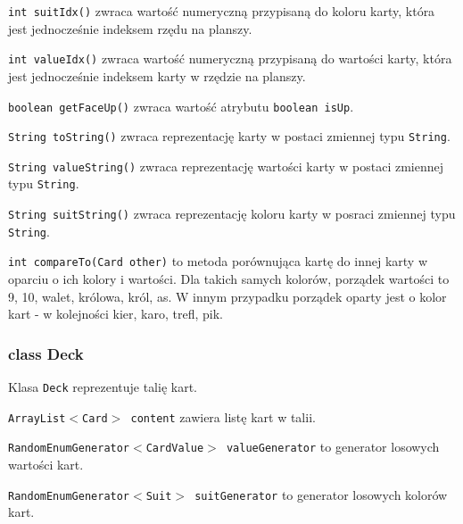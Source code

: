 \documentclass{article}
\begin{document}
\texttt{int suitIdx()} zwraca wartość numeryczną przypisaną do koloru karty, która jest jednocześnie indeksem rzędu na planszy.

\texttt{int valueIdx()} zwraca wartość numeryczną przypisaną do wartości karty, która jest jednocześnie indeksem karty w rzędzie na planszy.

\texttt{boolean getFaceUp()} zwraca wartość atrybutu \texttt{boolean isUp}.

\texttt{String toString()} zwraca reprezentację karty w postaci zmiennej typu \texttt{String}.

\texttt{String valueString()} zwraca reprezentację wartości karty w postaci zmiennej typu \texttt{String}.

\texttt{String suitString()} zwraca reprezentację koloru karty w posraci zmiennej typu \texttt{String}.

\texttt{int compareTo(Card other)} to metoda porównująca  kartę do innej karty w oparciu o ich kolory i wartości. Dla takich samych kolorów, porządek wartości to 9, 10, walet, królowa, król, as. W innym przypadku porządek oparty jest o kolor kart - w kolejności kier, karo, trefl, pik.

\subsubsection*{class Deck}

\begin{center}
\end{center}

Klasa \texttt{Deck} reprezentuje talię kart.

\texttt{ArrayList$<$Card$>$ content} zawiera listę kart w talii. 

\texttt{RandomEnumGenerator$<$CardValue$>$ valueGenerator} to generator losowych wartości kart.

\texttt{RandomEnumGenerator$<$Suit$>$ suitGenerator} to generator losowych kolorów kart.
\end{document}
